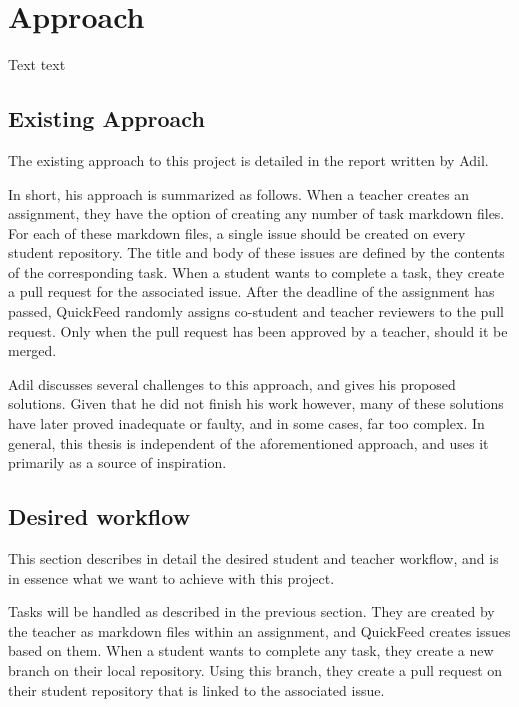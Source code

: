 
\chapter{Approach}
\label{ch:approach}

Text text
 
\section{Existing Approach}

The existing approach to this project is detailed in the report written by Adil.

In short, his approach is summarized as follows.
When a teacher creates an assignment, they have the option of creating any number of task markdown files.
For each of these markdown files, a single issue should be created on every student repository.
The title and body of these issues are defined by the contents of the corresponding task.
When a student wants to complete a task, they create a pull request for the associated issue.
After the deadline of the assignment has passed, QuickFeed randomly assigns co-student and teacher reviewers to the pull request. 
Only when the pull request has been approved by a teacher, should it be merged.

Adil discusses several challenges to this approach, and gives his proposed solutions.
Given that he did not finish his work however, many of these solutions have later proved inadequate or faulty, and in some cases, far too complex.
In general, this thesis is independent of the aforementioned approach, and uses it primarily as a source of inspiration.

\section{Desired workflow}

This section describes in detail the desired student and teacher workflow, and is in essence what we want to achieve with this project.

Tasks will be handled as described in the previous section.
They are created by the teacher as markdown files within an assignment, and QuickFeed creates issues based on them.
When a student wants to complete any task, they create a new branch on their local repository.
Using this branch, they create a pull request on their student repository that is linked to the associated issue.

